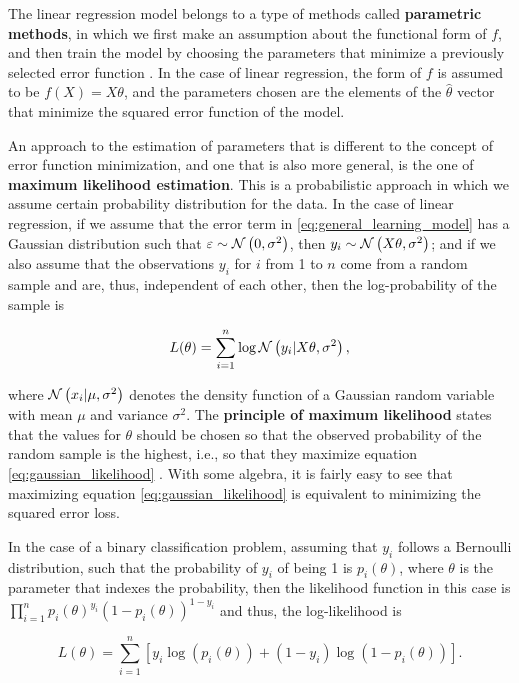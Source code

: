 The linear regression model belongs to a type of methods called \textbf{parametric methods}, in which we first make an assumption about the functional form of $f$, and then train the model by choosing the parameters that minimize a previously selected error function \cite[p.~21]{james2013introduction}. In the case of linear regression, the form of $f$ is assumed to be $f(X) = X\theta$, and the parameters chosen are the elements of the $\hat{\theta}$ vector that minimize the squared error function of the model.

An approach to the estimation of parameters that is different to the concept of error function minimization, and one that is also more general, is the one of \textbf{maximum likelihood estimation}.
This is a probabilistic approach in which we assume certain probability distribution for the data.
In the case of linear regression, if we assume that the error term in \ref{eq:general_learning_model} has a Gaussian distribution such that $\varepsilon \sim \mathcal{N}\left( 0, \sigma^2 \right)$, then $y_i \sim \mathcal{N}\left( X \theta, \sigma^2 \right)$; and if we also assume that the observations $y_i$ for $i$ from 1 to $n$ come from a random sample and are, thus, independent of each other, then the log-probability of the sample is

\begin{equation}
  \label{eq:gaussian_likelihood}
  L(\theta) = \sum_{i = 1}^n \log \mathcal{N}\left( y_i | X \theta, \sigma^2 \right),
\end{equation}

where $\mathcal{N}\left( x_i | \mu, \sigma^2 \right)$ denotes the density function of a Gaussian random variable with mean $\mu$ and variance $\sigma^2$. The \textbf{principle of maximum likelihood} states that the values for $\theta$ should be chosen so that the observed probability of the random sample is the highest, i.e., so that they maximize equation \ref{eq:gaussian_likelihood} \cite[p.~31]{friedman2001elements}.
With some algebra, it is fairly easy to see that maximizing equation \ref{eq:gaussian_likelihood} is equivalent to minimizing the squared error loss.

In the case of a binary classification problem, assuming that $y_i$ follows a Bernoulli distribution, such that the probability of $y_i$ of being 1 is $p_i(\theta)$, where $\theta$ is the parameter that indexes the probability, then the likelihood function in this case is $\prod_{i = 1}^n  p_i(\theta)^{y_i}\left(1 - p_i(\theta) \right)^{1 - y_i}$ and thus, the log-likelihood is

$$
  L(\theta) = \sum_{i = 1}^n \left[ y_i \log\left( p_i(\theta) \right) + (1 - y_i) \log \left( 1 - p_i(\theta) \right) \right].
$$

